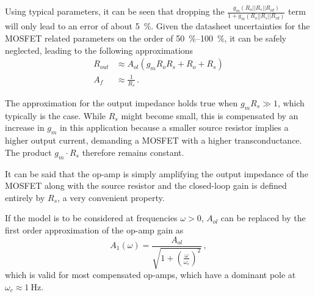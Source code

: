 \documentclass[12pt]{book}
\begin{document}
Using typical parameters, it can be seen that dropping the $\frac{g_m \left(R_o || R_s || R_{id}\right)}{1 + g_m \left(R_o || R_s || R_{id}\right)}$ term will only lead to an error of about \qty{5}{\percent}. Given the datasheet uncertainties for the MOSFET related parameters on the order of \qtyrange{50}{100}{\percent}, it can be safely neglected, leading to the following approximations
\begin{align}
    R_{out} &\approx A_{ol} \left(g_m R_o R_s + R_o + R_s \right)\\
    A_f &\approx \frac{1}{R_s} \,. \nonumber
\end{align}

The approximation for the output impedance holds true when $g_m R_s \gg 1$, which typically is the case. While $R_s$ might become small, this is compensated by an increase in $g_m$ in this application because a smaller source resistor implies a higher output current, demanding a MOSFET with a higher transconductance. The product $g_m \cdot R_s$ therefore remains constant.

It can be said that the op-amp is simply amplifying the output impedance of the MOSFET along with the source resistor and the closed-loop gain is defined entirely by $R_s$, a very convenient property.

If the model is to be considered at frequencies $\omega > 0$, $A_{ol}$ can be replaced by the first order approximation of the op-amp gain as
\begin{equation}
    A_1 (\omega) = \frac{A_{ol}}{\sqrt{1 + \left(\frac{\omega}{\omega_c}\right)^2}}\,,\label{eqn:op-amp_gain}
\end{equation}
which is valid for most compensated op-amps, which have a dominant pole at $\omega_c \approx \qty{1}{\Hz}$.
\end{document}
